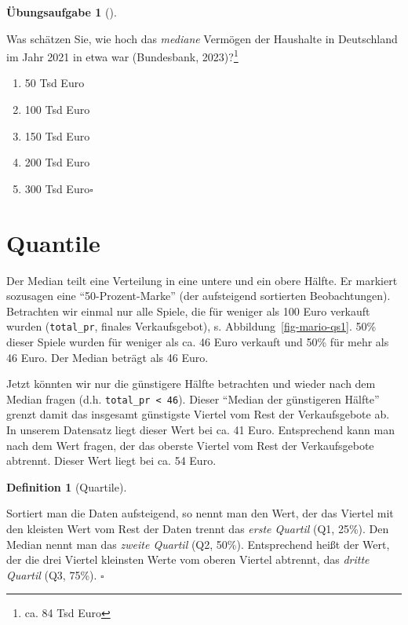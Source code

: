 \documentclass[
  letterpaper,
  twoside,
  open=any]{scrbook}
\providecommand{\tightlist}{%
  \setlength{\itemsep}{0pt}\setlength{\parskip}{0pt}}\usepackage{longtable,booktabs,array}
\theoremstyle{definition}
\newtheorem{definition}{Definition}[chapter]
\theoremstyle{definition}
\newtheorem{exercise}{Übungsaufgabe}[chapter]
\theoremstyle{definition}
\theoremstyle{remark}
\begin{document}
\begin{exercise}[]\protect\hypertarget{exr-mw-wealthmd}{}\label{exr-mw-wealthmd}

Was schätzen Sie, wie hoch das \emph{mediane} Vermögen der Haushalte in
Deutschland im Jahr 2021 in etwa war (Bundesbank, 2023)?\footnote{ca. 84
  Tsd Euro}

\begin{enumerate}
\def\labelenumi{\alph{enumi})}
\tightlist
\item
  50 Tsd Euro
\item
  100 Tsd Euro
\item
  150 Tsd Euro
\item
  200 Tsd Euro
\item
  300 Tsd Euro\(\square\)
\end{enumerate}

\end{exercise}

\section{Quantile}\label{quantile}

Der Median teilt eine Verteilung in eine untere und ein obere Hälfte. Er
markiert sozusagen eine \enquote{50-Prozent-Marke} (der aufsteigend
sortierten Beobachtungen). Betrachten wir einmal nur alle Spiele, die
für weniger als 100 Euro verkauft wurden (\texttt{total\_pr}, finales
Verkaufsgebot), s. Abbildung~\ref{fig-mario-qs1}. 50\% dieser Spiele
wurden für weniger als ca. 46 Euro verkauft und 50\% für mehr als 46
Euro. Der Median beträgt als 46 Euro.

Jetzt könnten wir nur die günstigere Hälfte betrachten und wieder nach
dem Median fragen (d.h. \texttt{total\_pr\ \textless{}\ 46}). Dieser
\enquote{Median der günstigeren Hälfte} grenzt damit das insgesamt
günstigste Viertel vom Rest der Verkaufsgebote ab. In unserem Datensatz
liegt dieser Wert bei ca. 41 Euro. Entsprechend kann man nach dem Wert
fragen, der das oberste Viertel vom Rest der Verkaufsgebote abtrennt.
Dieser Wert liegt bei ca. 54 Euro.

\begin{definition}[Quartile]\protect\hypertarget{def-quartile}{}\label{def-quartile}

Sortiert man die Daten aufsteigend, so nennt man den Wert, der das
Viertel mit den kleisten Wert vom Rest der Daten trennt das \emph{erste
Quartil} (Q1, 25\%). Den Median nennt man das \emph{zweite Quartil} (Q2,
50\%). Entsprechend heißt der Wert, der die drei Viertel kleinsten Werte
vom oberen Viertel abtrennt, das \emph{dritte Quartil} (Q3, 75\%).
\(\square\)

\end{definition}
\end{document}
